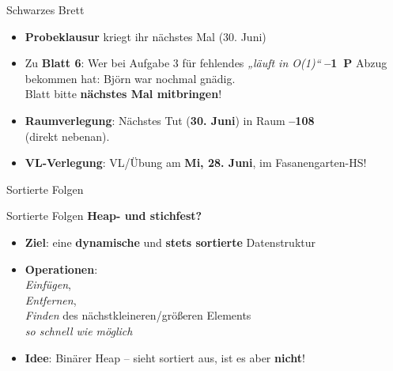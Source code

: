 




	
	
\begin{frame}{Schwarzes Brett}
	\begin{itemize}
		\item \textbf{Probeklausur} kriegt ihr nächstes Mal {\small (30. Juni)}
		\item Zu \textbf{Blatt 6}: Wer bei Aufgabe 3 für fehlendes \textit{„läuft in O(1)“} \textbf{–1~P} Abzug bekommen hat: Björn war nochmal gnädig. \smiley \\
		\impl Blatt bitte \textbf{nächstes Mal mitbringen}! 
		\item \textbf{Raumverlegung}: Nächstes Tut (\textbf{30. Juni}) in Raum \textbf{–108} \\ 
		(direkt nebenan).
		\item \textbf{VL-Verlegung}: VL/Übung am \textbf{Mi, 28. Juni}, im Fasanengarten-HS!
	\end{itemize}
\end{frame}


\begin{headframe}
	Sortierte Folgen
\end{headframe}

\begin{frame}{Sortierte Folgen}
	\textbf{Heap- und stichfest?} 
	\begin{itemize}
		\item \textbf{Ziel}: eine \textbf{dynamische} und \textbf{stets sortierte} Datenstruktur
		\pause
		\item \textbf{Operationen}: \\ 
		\emph{Einfügen}, \\
		\emph{Entfernen}, \\
		\emph{Finden} des nächstkleineren/größeren Elements \\
		\impl \emph{so schnell wie möglich}
		\pause
		\item \textbf{Idee}: Binärer Heap – sieht sortiert aus, ist es aber \textbf{nicht}!
	\end{itemize}
\end{frame}

